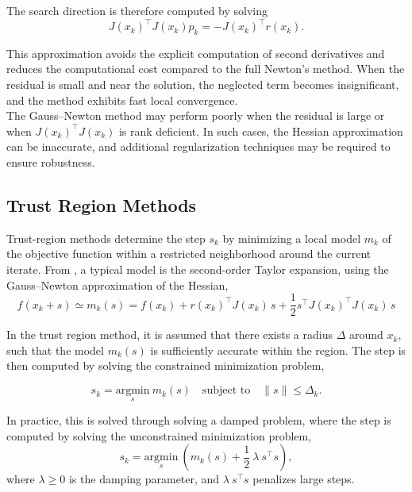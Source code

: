 The search direction is therefore computed by solving
\begin{equation}
\label{eq:gauss_newton}
    J(x_k)^\top J(x_k) p_k = - J(x_k)^\top r(x_k).
\end{equation}

This approximation avoids the explicit computation of second derivatives and reduces the computational cost compared to the full Newton's method. When the residual is small and near the solution, the neglected term becomes insignificant, and the method exhibits fast local convergence.\\

The Gauss--Newton method may perform poorly when the residual is large or when $J(x_k)^\top J(x_k)$ is rank deficient. In such cases, the Hessian approximation can be inaccurate, and additional regularization techniques may be required to ensure robustness.

\subsection{Trust Region Methods}
\label{sec:trust_region_methods}

Trust-region methods determine the step $s_k$ by minimizing a local model $m_k$ of the objective function within a restricted neighborhood around the current iterate. From \cite{madsen2004}, a typical model is the second-order Taylor expansion, using the Gauss--Newton approximation of the Hessian, 
\begin{equation}
\label{eq:mk}
f(x_k+s) \simeq m_k(s) = f(x_k) + r(x_k)^\top J(x_k) \, s + \frac{1}{2} s^\top J(x_k)^\top J(x_k) \, s
\end{equation}

In the trust region method, it is assumed that there exists a radius $\Delta$ around $x_k$, such that the model $m_k(s)$ is sufficiently accurate within the region. The step is then computed by solving the constrained minimization problem,

\begin{equation*}
    s_k = \underset{s}{\text{argmin}} \ m_k(s) \quad \text{subject to} \quad \|s\| \leq \Delta_k.
\end{equation*}

In practice, this is solved through solving a damped problem, where the step is computed by solving the unconstrained minimization problem,
\begin{equation}
\label{eq:damped_problem}
    s_k = \underset{s}{\text{argmin}} \ \left(m_k(s) + \frac{1}{2} \ \lambda \ s^\top s\right),
\end{equation}
where $\lambda \geq 0$ is the damping parameter, and $\lambda \ s^\top s$ penalizes large steps. \\

